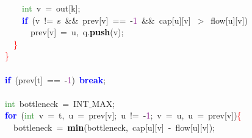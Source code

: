 {{\mbox{}\ \ \ \ \ \ \ \ \textcolor{ForestGreen}{int}\ v\ \textcolor{BrickRed}{=}\ out\textcolor{BrickRed}{[}k\textcolor{BrickRed}{];} \\
\mbox{}\ \ \ \ \ \ \ \ \textbf{\textcolor{Blue}{if}}\ \textcolor{BrickRed}{(}v\ \textcolor{BrickRed}{!=}\ s\ \textcolor{BrickRed}{\&\&}\ prev\textcolor{BrickRed}{[}v\textcolor{BrickRed}{]}\ \textcolor{BrickRed}{==}\ \textcolor{BrickRed}{-}\textcolor{Purple}{1}\ \textcolor{BrickRed}{\&\&}\ cap\textcolor{BrickRed}{[}u\textcolor{BrickRed}{][}v\textcolor{BrickRed}{]}\ \textcolor{BrickRed}{$>$}\ flow\textcolor{BrickRed}{[}u\textcolor{BrickRed}{][}v\textcolor{BrickRed}{])} \\
\mbox{}\ \ \ \ \ \ \ \ \ \ prev\textcolor{BrickRed}{[}v\textcolor{BrickRed}{]}\ \textcolor{BrickRed}{=}\ u\textcolor{BrickRed}{,}\ q\textcolor{BrickRed}{.}\textbf{\textcolor{Black}{push}}\textcolor{BrickRed}{(}v\textcolor{BrickRed}{);} \\
\mbox{}\ \ \ \ \ \ \textcolor{Red}{\}} \\
\mbox{}\ \ \ \ \textcolor{Red}{\}} \\
\mbox{} \\
\mbox{}\ \ \ \ \textbf{\textcolor{Blue}{if}}\ \textcolor{BrickRed}{(}prev\textcolor{BrickRed}{[}t\textcolor{BrickRed}{]}\ \textcolor{BrickRed}{==}\ \textcolor{BrickRed}{-}\textcolor{Purple}{1}\textcolor{BrickRed}{)}\ \textbf{\textcolor{Blue}{break}}\textcolor{BrickRed}{;} \\
\mbox{} \\
\mbox{}\ \ \ \ \textcolor{ForestGreen}{int}\ bottleneck\ \textcolor{BrickRed}{=}\ INT$\_$MAX\textcolor{BrickRed}{;} \\
\mbox{}\ \ \ \ \textbf{\textcolor{Blue}{for}}\ \textcolor{BrickRed}{(}\textcolor{ForestGreen}{int}\ v\ \textcolor{BrickRed}{=}\ t\textcolor{BrickRed}{,}\ u\ \textcolor{BrickRed}{=}\ prev\textcolor{BrickRed}{[}v\textcolor{BrickRed}{];}\ u\ \textcolor{BrickRed}{!=}\ \textcolor{BrickRed}{-}\textcolor{Purple}{1}\textcolor{BrickRed}{;}\ v\ \textcolor{BrickRed}{=}\ u\textcolor{BrickRed}{,}\ u\ \textcolor{BrickRed}{=}\ prev\textcolor{BrickRed}{[}v\textcolor{BrickRed}{])}\textcolor{Red}{\{} \\
\mbox{}\ \ \ \ \ \ bottleneck\ \textcolor{BrickRed}{=}\ \textbf{\textcolor{Black}{min}}\textcolor{BrickRed}{(}bottleneck\textcolor{BrickRed}{,}\ cap\textcolor{BrickRed}{[}u\textcolor{BrickRed}{][}v\textcolor{BrickRed}{]}\ \textcolor{BrickRed}{-}\ flow\textcolor{BrickRed}{[}u\textcolor{BrickRed}{][}v\textcolor{BrickRed}{]);} \\
}}

